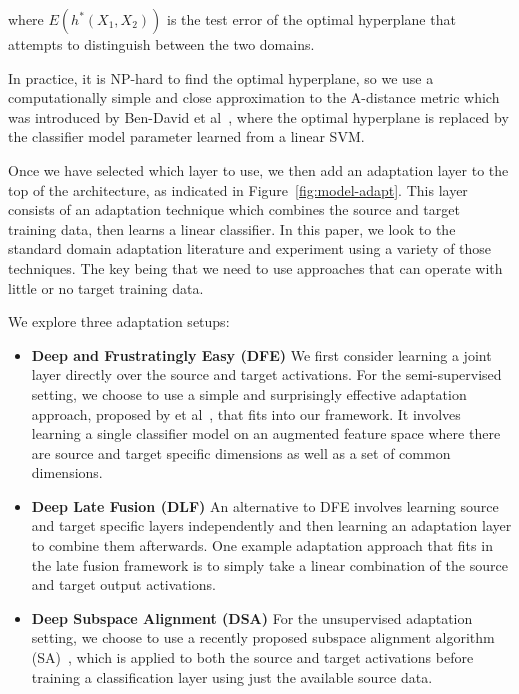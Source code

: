 where $E(h^*(X_1, X_2))$ is the test error of the optimal hyperplane that attempts to
distinguish between the two domains.

In practice, it is NP-hard to find the optimal hyperplane, so we use a computationally simple and 
close approximation to the A-distance metric which was introduced by Ben-David et al~\cite{adist-comp}, 
where the optimal hyperplane is replaced by the classifier model parameter learned from a linear SVM.

Once we have selected which layer to use, we then add an adaptation layer to
the top of the architecture, as indicated in Figure~\ref{fig:model-adapt}. This layer
consists of an adaptation technique which combines the source and target
training data, then learns a linear classifier. In this paper, we look to the
standard domain adaptation literature and experiment using a variety of those
techniques. The key being that we need to use approaches that can operate with little or no
target training data.

We explore three adaptation setups:
\begin{itemize}
  \item \textbf{Deep and Frustratingly Easy (DFE)}
    We first consider learning a joint layer directly over the source and target
    activations. For the semi-supervised setting, we choose to use a simple and
    surprisingly effective adaptation approach, proposed by \daume
    et al~\cite{daume}, that fits into our framework. It involves learning a
    single classifier model on an augmented feature space where there are source
    and target specific dimensions as well as a set of common dimensions.

  \item \textbf{Deep Late Fusion (DLF)}
    An alternative to DFE involves learning source and target specific layers
    independently and then learning an adaptation layer to combine them
    afterwards. One example adaptation approach that fits in the late fusion
    framework is to simply take a linear combination of the source and target
    output activations.

  \item \textbf{Deep Subspace Alignment (DSA)}
    For the unsupervised adaptation setting, we choose to use a recently
    proposed subspace alignment algorithm (SA)~\cite{sa}, which is applied to
    both the source and target activations before training a classification
    layer using just the available source data.

\end{itemize}

